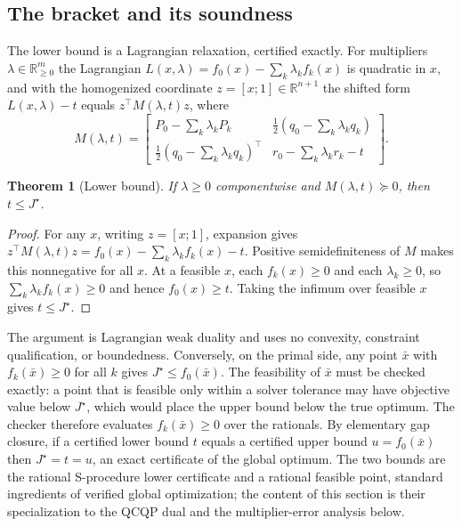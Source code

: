 \documentclass[11pt]{article}
\newcommand{\R}{\mathbb{R}}
\theoremstyle{plain}
\newtheorem{theorem}{Theorem}
\theoremstyle{remark}
\begin{document}
\subsection{The bracket and its soundness}

The lower bound is a Lagrangian relaxation, certified exactly. For multipliers
$\lambda \in \R^m_{\ge 0}$ the Lagrangian
$L(x, \lambda) = f_0(x) - \sum_k \lambda_k f_k(x)$ is quadratic in $x$, and with
the homogenized coordinate $z = [x; 1] \in \R^{n+1}$ the shifted form
$L(x, \lambda) - t$ equals $z^\top M(\lambda, t) z$, where
\begin{equation}
M(\lambda, t) = \begin{bmatrix}
P_0 - \sum_k \lambda_k P_k & \tfrac12(q_0 - \sum_k \lambda_k q_k) \\[2pt]
\tfrac12(q_0 - \sum_k \lambda_k q_k)^\top & r_0 - \sum_k \lambda_k r_k - t
\end{bmatrix}.
\label{eq:M}
\end{equation}

\begin{theorem}[Lower bound]\label{thm:sound}
If $\lambda \ge 0$ componentwise and $M(\lambda, t) \succeq 0$, then
$t \le J^\star$.
\end{theorem}
\begin{proof}
For any $x$, writing $z = [x; 1]$, expansion gives
$z^\top M(\lambda, t) z = f_0(x) - \sum_k \lambda_k f_k(x) - t$. Positive
semidefiniteness of $M$ makes this nonnegative for all $x$. At a feasible $x$,
each $f_k(x) \ge 0$ and each $\lambda_k \ge 0$, so
$\sum_k \lambda_k f_k(x) \ge 0$ and hence $f_0(x) \ge t$. Taking the infimum over
feasible $x$ gives $t \le J^\star$.
\end{proof}

The argument is Lagrangian weak duality and uses no convexity, constraint
qualification, or boundedness. Conversely, on the primal side, any point
$\bar x$ with $f_k(\bar x) \ge 0$ for all $k$ gives $J^\star \le f_0(\bar x)$. The
feasibility of $\bar x$ must be checked exactly: a point that is feasible only
within a solver tolerance may have objective value below $J^\star$, which would
place the upper bound below the true optimum. The checker therefore evaluates
$f_k(\bar x) \ge 0$ over the rationals. By elementary gap closure, if a certified
lower bound $t$ equals a certified upper bound $u = f_0(\bar x)$ then
$J^\star = t = u$, an exact certificate of the global optimum. The two bounds are
the rational S-procedure lower certificate and a rational feasible point,
standard ingredients of verified global optimization; the content of this section
is their specialization to the QCQP dual and the multiplier-error analysis below.
\end{document}
